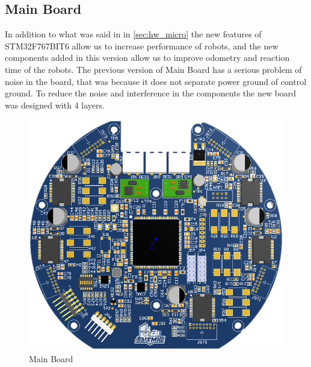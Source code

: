 \documentclass{llncs}
\begin{document}
\subsection{Main Board}
In addition to what was said in in \ref{sec:hw_micro} the new features of STM32F767BIT6 allow us to increase performance of robots, and the new components added in this version allow us to improve odometry and reaction time of the robots. The previous version of Main Board has a serious problem of noise in the board, that was because it does not separate power ground of control ground. To reduce the noise and interference in the components the new  board was designed with 4 layers.

\begin{figure}[H]
    \centering
    \includegraphics[scale=0.4]{PCB_3D_1.PNG}
    \caption{Main Board}
    \label{fig:main_board}
\end{figure}


\end{document}

